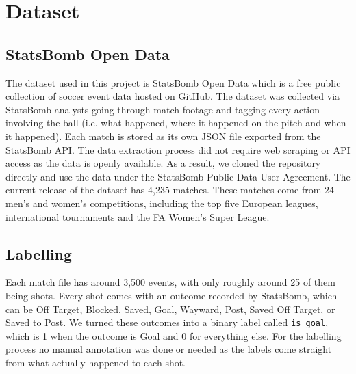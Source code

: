 \documentclass[11pt]{article}
\begin{document}
\section{Dataset}
\subsection{StatsBomb Open Data}
The dataset used in this project is \href{https://github.com/hudl/open-data}{StatsBomb Open Data} which is a free public collection of soccer event data hosted on GitHub. The dataset was collected via StatsBomb analysts going through match footage and tagging every action involving the ball (i.e. what happened, where it happened on the pitch and when it happened). Each match is stored as its own JSON file exported from the StatsBomb API. The data extraction process did not require web scraping or API access as the data is openly available. As a result, we cloned the repository directly and use the data under the StatsBomb Public Data User Agreement.
The current release of the dataset has 4,235 matches. These matches come from 24 men's and women's competitions, including the top five European leagues, international tournaments and the FA Women's Super League.

\subsection{Labelling}
Each match file has around 3,500 events, with only roughly around 25 of them being shots. Every shot comes with an outcome recorded by StatsBomb, which can be Off Target, Blocked, Saved, Goal, Wayward, Post, Saved Off Target, or Saved to Post. We turned these outcomes into a binary label called \texttt{is\_goal}, which is 1 when the outcome is Goal and 0 for everything else. For the labelling process no manual annotation was done or needed as the labels come straight from what actually happened to each shot.
\end{document}
